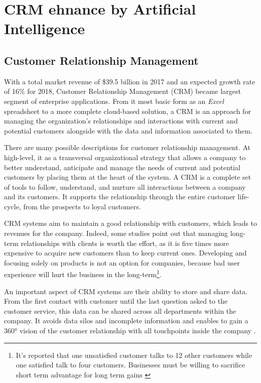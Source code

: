 \chapter{CRM ehnance by Artificial Intelligence}
\label{sec:crm-ai}


\section{Customer Relationship Management}

With a total market revenue of \$39.5 billion in 2017 and an expected growth rate of 16\% for 2018, Customer Relationship Management (CRM) became largest segment of enterprise applications\cite{gartner-crm-market}. From it most basic form as an \textit{Excel} spreadsheet to a more complete cloud-based solution, a CRM is an approach for managing the organization's relationships and interactions with current and potential customers alongside with the data and information associated to them\cite{salesforce:CRM-def}.

There are many possible descriptions for customer relationship management. At high-level, it as a transversal organizational strategy that allows a company to better understand, anticipate and manage the needs of current and potential customers by placing them at the heart of the system\cite{brown2000customer}\nocite{biedermann-crm}. A CRM is a complete set of tools to follow, understand, and nurture all interactions between a company and its customers. It supports the relationship through the entire customer life-cycle, from the prospects to loyal customers. 

CRM systems aim to maintain a good relationship with customers, which leads to revenues for the company. Indeed, some studies point out that managing long-term relationships with clients is worth the effort, as it is five times more expensive to acquire new customers than to keep current ones\cite{crm-facts}. Developing and focusing solely on products is not an option for companies, because bad user experience will hurt the business in the long-term\footnote{It's reported that one unsatisfied customer talks to 12 other customers while one satisfied talk to four customers. Businesses must be willing to sacrifice short term advantage for long term gains \cite{crm-facts,bennet,crm-essay}}.

An important aspect of CRM systems are their ability to store and share data. From the first contact with customer until the last question asked to the customer service, this data can be shared across all departments within the company. It avoids data silos and incomplete information and enables to gain a 360° vision of the customer relationship with all touchpoints inside the company \cite{efficy-crm}.

